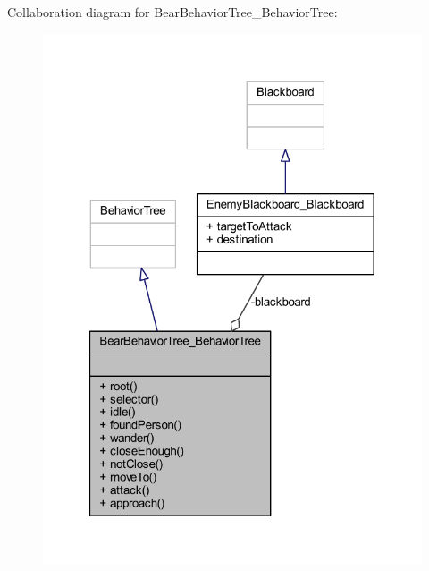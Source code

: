 Collaboration diagram for Bear\+Behavior\+Tree\+\_\+\+Behavior\+Tree\+:\nopagebreak
\begin{figure}[H]
\begin{center}
\leavevmode
\includegraphics[width=321pt]{class_bear_behavior_tree___behavior_tree__coll__graph}
\end{center}
\end{figure}

